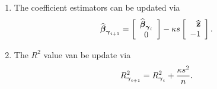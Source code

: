 \documentclass{article}[12pt]
\begin{document}
\begin{enumerate}
	\item
	The coefficient estimators 
	can be updated via
	$$
	\begin{array}{rl}
	\displaystyle \widehat{{\boldsymbol \beta}}_{{\boldsymbol \gamma}_{i+1}}
	= \left[ \begin{array}{c}
	\widehat{{\boldsymbol \beta}}_{{\boldsymbol \gamma}_{i}} \\
	0 
	\end{array} \right] - \kappa s  \left[ \begin{array}{r}
	\widehat{{\bf z}}   \\
	- 1
	\end{array} \right].
	\end{array} 
	$$
	
	\item The $R^2$ value van be update via
	$$
	\begin{array}{rl}
	\ds 
	R_{\vgamma_{i+1}}^2 
	= R_{\vgamma_{i}}^2
	+ \frac{\kappa s^2}{n}.
	
	\end{array}
	$$
	
\end{enumerate}
\end{document}
